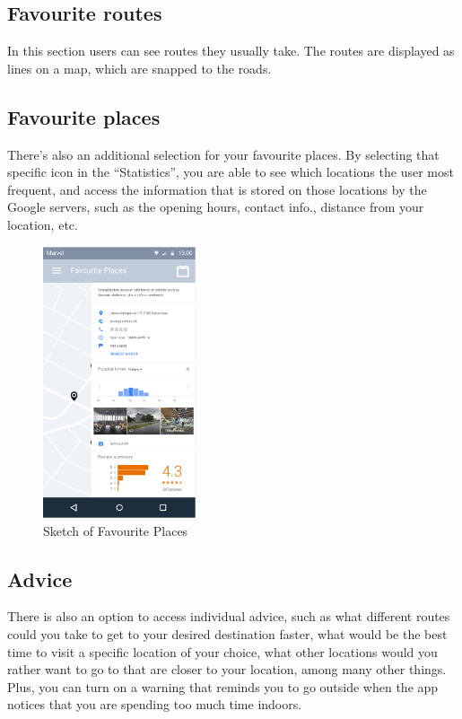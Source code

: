 \documentclass[12p]{article}
\begin{document}
    		\subsection{Favourite routes}
    		In this section users can see routes they usually take. The routes are displayed as lines on a map, which are snapped to the roads.
    		
    		\subsection{Favourite places}
            
    		There’s also an additional selection for your favourite places. By selecting that specific icon in the “Statistics”, you are able to see which locations the user most frequent, and access the information that is stored on those locations by the Google servers, such as the opening hours, contact info., distance from your location, etc.

            \begin{figure}[ht]
    		    \center
                \includegraphics[height=8cm,keepaspectratio]{pics/app_design/fav_places.PNG}
                \caption{Sketch of Favourite Places}
            \end{figure}
    		
    		\subsection{Advice}
    		There is also an option to access individual advice, such as what different routes could you take to get to your desired destination faster, what would be the best time to visit a specific location of your choice, what other locations would you rather want to go to that are closer to your location, among many other things. Plus, you can turn on a warning that reminds you to go outside when the app notices that you are spending too much time indoors.
    		
\end{document}
